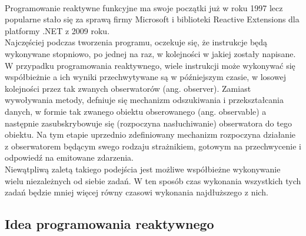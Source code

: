 \documentclass[12pt,oneside,a4paper]{report}
\begin{document}
\paragraph{}Programowanie reaktywne funkcyjne ma swoje początki już w roku 1997\cite{beginningOfRx} lecz popularne stało się za sprawą firmy Microsoft i biblioteki Reactive Extensions dla platformy .NET z 2009 roku\cite{rxMicrosoftYear}.\\
Najczęściej podczas tworzenia programu, oczekuje się, że instrukcje będą wykonywane stopniowo, po jednej na raz, w kolejności w jakiej zostały napisane. W przypadku programowania reaktywnego, wiele instrukcji może wykonywać się współbieżnie a ich wyniki przechwytywane są w późniejszym czasie, w losowej kolejności przez tak zwanych obserwatorów (ang. observer). Zamiast wywoływania metody, defniuje się mechanizm odszukiwania i przekształcania danych, w formie tak zwanego obiektu obserowanego (ang. observable) a następnie zasubskrybowuje się (rozpoczyna nasłuchiwanie) obserwatora do tego obiektu. Na tym etapie uprzednio zdefiniowany mechanizm rozpoczyna działanie z obserwatorem będącym swego rodzaju strażnikiem, gotowym na przechwycenie i odpowiedź na emitowane zdarzenia.\\
Niewątpliwą zaletą takiego podejścia jest możliwe współbieżne wykonywanie wielu niezależnych od siebie zadań. W ten sposób czas wykonania wszystkich tych zadań będzie mniej więcej równy czasowi wykonania najdłuższego z nich.
\subsection{Idea programowania reaktywnego}
\end{document}
